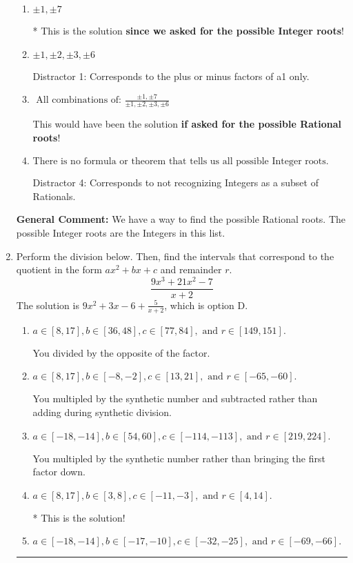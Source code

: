 \documentclass{extbook}[14pt]
\newcommand{\litem}[1]{\item #1

\rule{\textwidth}{0.4pt}}
\begin{document}
\begin{enumerate}
{\begin{enumerate}[label=\Alph*.]
 Distractor 3: Corresponds to the plus or minus of the inverse quotient (an/a0) of the factors. 
\item \( \pm 1,\pm 7 \)

* This is the solution \textbf{since we asked for the possible Integer roots}!
\item \( \pm 1,\pm 2,\pm 3,\pm 6 \)

 Distractor 1: Corresponds to the plus or minus factors of a1 only.
\item \( \text{ All combinations of: }\frac{\pm 1,\pm 7}{\pm 1,\pm 2,\pm 3,\pm 6} \)

This would have been the solution \textbf{if asked for the possible Rational roots}!
\item \( \text{There is no formula or theorem that tells us all possible Integer roots.} \)

 Distractor 4: Corresponds to not recognizing Integers as a subset of Rationals.
\end{enumerate}

\textbf{General Comment:} We have a way to find the possible Rational roots. The possible Integer roots are the Integers in this list.
}
\litem{
Perform the division below. Then, find the intervals that correspond to the quotient in the form $ax^2+bx+c$ and remainder $r$.
\[ \frac{9x^{3} +21 x^{2} -7}{x + 2} \]The solution is \( 9x^{2} +3 x -6 + \frac{5}{x + 2} \), which is option D.\begin{enumerate}[label=\Alph*.]
\item \( a \in [8, 17], b \in [36, 48], c \in [77, 84], \text{ and } r \in [149, 151]. \)

 You divided by the opposite of the factor.
\item \( a \in [8, 17], b \in [-8, -2], c \in [13, 21], \text{ and } r \in [-65, -60]. \)

 You multipled by the synthetic number and subtracted rather than adding during synthetic division.
\item \( a \in [-18, -14], b \in [54, 60], c \in [-114, -113], \text{ and } r \in [219, 224]. \)

 You multipled by the synthetic number rather than bringing the first factor down.
\item \( a \in [8, 17], b \in [3, 8], c \in [-11, -3], \text{ and } r \in [4, 14]. \)

* This is the solution!
\item \( a \in [-18, -14], b \in [-17, -10], c \in [-32, -25], \text{ and } r \in [-69, -66]. \)


\end{enumerate}}
\end{enumerate}
\end{document}
